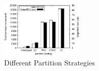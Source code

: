 
\begin{figure}[h]\centering
	\includegraphics[width=0.35\textwidth]{figs/exp_partition_strategy.eps}
	\caption{Different Partition Strategies}
	\label{fig:exp_partition_strategy}
\end{figure}


